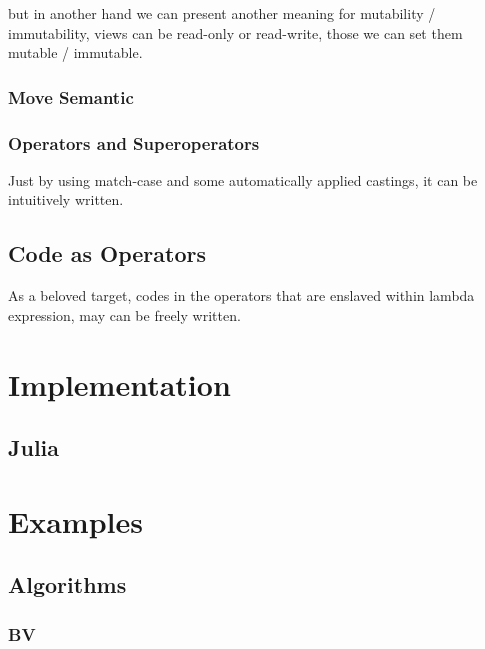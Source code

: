 \documentclass[a4paper,11pt]{article}
\begin{document}
but in another hand we can present another meaning for mutability / immutability, 
views can be read-only or read-write, those we can set them mutable / immutable.

\subsubsection{Move Semantic}

\subsubsection{Operators and Superoperators}
Just by using match-case and some automatically applied castings, it can be intuitively written.

\subsection{Code as Operators}
As a beloved target, codes in the operators that are enslaved within lambda expression, may can be freely written. 

\section{Implementation}
\subsection{Julia}
\section{Examples}
\subsection{Algorithms}
\subsubsection{BV}
\end{document}
